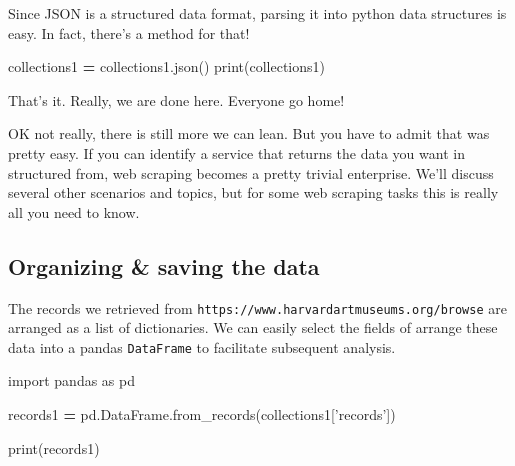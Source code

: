 \documentclass[
]{book}
\newenvironment{Shaded}{\begin{snugshade}}{\end{snugshade}}
\newcommand{\BuiltInTok}[1]{#1}
\newcommand{\ImportTok}[1]{#1}
\newcommand{\NormalTok}[1]{#1}
\newcommand{\OperatorTok}[1]{\textcolor[rgb]{0.81,0.36,0.00}{\textbf{#1}}}
\newcommand{\StringTok}[1]{\textcolor[rgb]{0.31,0.60,0.02}{#1}}
\begin{document}
Since JSON is a structured data format, parsing it into python data
structures is easy. In fact, there's a method for that!

\begin{Shaded}
\begin{Highlighting}[]
\NormalTok{collections1 }\OperatorTok{=}\NormalTok{ collections1.json()}
\BuiltInTok{print}\NormalTok{(collections1)}
\end{Highlighting}
\end{Shaded}

That's it. Really, we are done here. Everyone go home!

OK not really, there is still more we can lean. But you have to admit
that was pretty easy. If you can identify a service that returns the
data you want in structured from, web scraping becomes a pretty
trivial enterprise. We'll discuss several other scenarios and topics,
but for some web scraping tasks this is really all you need to know.

\hypertarget{organizing-saving-the-data}{%
\subsection{Organizing \& saving the data}\label{organizing-saving-the-data}}

The records we retrieved from
\texttt{https://www.harvardartmuseums.org/browse} are arranged as a list of
dictionaries. We can easily select the fields of arrange these data
into a pandas \texttt{DataFrame} to facilitate subsequent analysis.

\begin{Shaded}
\begin{Highlighting}[]
\ImportTok{import}\NormalTok{ pandas }\ImportTok{as}\NormalTok{ pd}
\end{Highlighting}
\end{Shaded}

\begin{Shaded}
\begin{Highlighting}[]
\NormalTok{records1 }\OperatorTok{=}\NormalTok{ pd.DataFrame.from_records(collections1[}\StringTok{'records'}\NormalTok{])}
\end{Highlighting}
\end{Shaded}

\begin{Shaded}
\begin{Highlighting}[]
\BuiltInTok{print}\NormalTok{(records1)}
\end{Highlighting}
\end{Shaded}
\end{document}
